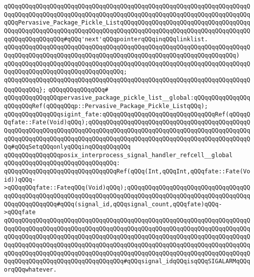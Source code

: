 \verb|qQQqqQQqqQQqqQQqqQQqqQQqqQQqqQQqqQQqqQQqqQQqqQQqqQQqqQQqqQQqqQQqqQQqqQQqqQQqqQQqqQQqqQQqqQQqqQQqqQQqqQQqqQQqqQQqqQQqqQQqqQQqqQQqqQQqqQQqqQQqqQQqPervasive_Package_Pickle_ListqQQqqQQqqQQqqQQqqQQqqQQqqQQqqQQqqQQqqQQqqQQqqQQqqQQqqQQqqQQqqQQqqQQqqQQqqQQqqQQqqQQqqQQqqQQqqQQqqQQqqQQqqQQqqQQqqQQqqQQqqQQq#qQQq'next'qQQqpointerqQQqinqQQqlinklist.|\newline
\verb|qQQqqQQqqQQqqQQqqQQqqQQqqQQqqQQqqQQqqQQqqQQqqQQqqQQqqQQqqQQqqQQqqQQqqQQqqQQqqQQqqQQqqQQqqQQqqQQqqQQqqQQqqQQqqQQqqQQqqQQqqQQqqQQqqQQqqQQq)|\newline
\verb|qQQqqQQqqQQqqQQqqQQqqQQqqQQqqQQqqQQqqQQqqQQqqQQqqQQqqQQqqQQqqQQqqQQqqQQqqQQqqQQqqQQqqQQqqQQqqQQqqQQqqQQq;|\newline
\verb|qQQqqQQqqQQqqQQqqQQqqQQqqQQqqQQqqQQqqQQqqQQqqQQqqQQqqQQqqQQqqQQqqQQqqQQqqQQqqQQq};|\newline
\verb|qQQqqQQqqQQqqQQq#|\newline
\verb|qQQqqQQqqQQqqQQqpervasive_package_pickle_list__global:qQQqqQQqqQQqqQQqqQQqqQQqRef(qQQqqQQqp::Pervasive_Package_Pickle_ListqQQq);|\newline
\newline
\verb|qQQqqQQqqQQqqQQqsigint_fate:qQQqqQQqqQQqqQQqqQQqqQQqqQQqqQQqRef(qQQqqQQqfate::Fate(Void)qQQq);qQQqqQQqqQQqqQQqqQQqqQQqqQQqqQQqqQQqqQQqqQQqqQQqqQQqqQQqqQQqqQQqqQQqqQQqqQQqqQQqqQQqqQQqqQQqqQQqqQQqqQQqqQQqqQQqqQQqqQQqqQQqqQQqqQQqqQQqqQQqqQQqqQQqqQQqqQQqqQQqqQQqqQQqqQQqqQQqqQQqqQQqqQQq#qQQqSetqQQqonlyqQQqinqQQqqQQqqQQq|\newline
\newline
\verb|qQQqqQQqqQQqqQQqposix_interprocess_signal_handler_refcell__global|\newline
\verb|qQQqqQQqqQQqqQQqqQQqqQQqqQQqqQQq:|\newline
\verb|qQQqqQQqqQQqqQQqqQQqqQQqqQQqqQQqRef(qQQq(Int,qQQqInt,qQQqfate::Fate(Void))qQQq->qQQqqQQqfate::FateqQQq(Void)qQQq);qQQqqQQqqQQqqQQqqQQqqQQqqQQqqQQqqQQqqQQqqQQqqQQqqQQqqQQqqQQqqQQqqQQqqQQqqQQqqQQqqQQqqQQqqQQqqQQqqQQqqQQqqQQqqQQqqQQqqQQq#qQQq(signal_id,qQQqsignal_count,qQQqfate)qQQq->qQQqfate|\newline
\verb|qQQqqQQqqQQqqQQqqQQqqQQqqQQqqQQqqQQqqQQqqQQqqQQqqQQqqQQqqQQqqQQqqQQqqQQqqQQqqQQqqQQqqQQqqQQqqQQqqQQqqQQqqQQqqQQqqQQqqQQqqQQqqQQqqQQqqQQqqQQqqQQqqQQqqQQqqQQqqQQqqQQqqQQqqQQqqQQqqQQqqQQqqQQqqQQqqQQqqQQqqQQqqQQqqQQqqQQqqQQqqQQqqQQqqQQqqQQqqQQqqQQqqQQqqQQqqQQqqQQqqQQqqQQqqQQqqQQqqQQqqQQqqQQqqQQqqQQqqQQqqQQqqQQqqQQqqQQqqQQqqQQqqQQqqQQqqQQqqQQqqQQqqQQqqQQqqQQqqQQqqQQqqQQqqQQqqQQqqQQqqQQq#qQQqsignal_idqQQqisqQQqSIGALARMqQQqorqQQqwhatever.|\newline
